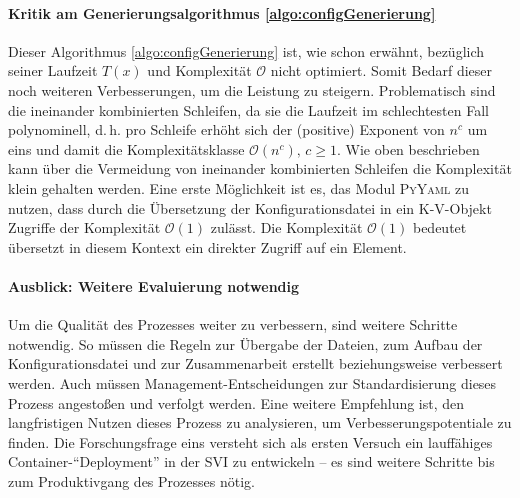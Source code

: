 \paragraph{Kritik am Generierungsalgorithmus \ref{algo:configGenerierung}} Dieser Algorithmus \vref{algo:configGenerierung} ist, wie schon erwähnt, bezüglich seiner Laufzeit $T(x)$ und Komplexität $\mathcal{O}$ nicht optimiert. Somit Bedarf dieser noch weiteren Verbesserungen, um die Leistung zu steigern. Problematisch sind die ineinander kombinierten Schleifen, da sie die Laufzeit im schlechtesten Fall polynominell, d.\,h. pro Schleife erhöht sich der (positive) Exponent von $n^{c}$  um eins und damit die Komplexitätsklasse $\mathcal{O}(n^{c}),\,c \ge 1$. Wie oben beschrieben kann über die Vermeidung von ineinander kombinierten Schleifen die Komplexität klein gehalten werden. Eine erste Möglichkeit ist es, das Modul \textsc{PyYaml} zu nutzen, dass durch die Übersetzung der Konfigurationsdatei in ein \ac{K-V}-Objekt Zugriffe der Komplexität $\mathcal{O}(1)$ zulässt. Die Komplexität $\mathcal{O}(1)$ bedeutet übersetzt in diesem Kontext ein direkter Zugriff auf ein Element.

\paragraph{Ausblick: Weitere Evaluierung notwendig} Um die Qualität des Prozesses weiter zu verbessern, sind weitere Schritte notwendig. So müssen die Regeln zur Übergabe der Dateien, zum Aufbau der Konfigurationsdatei und zur Zusammenarbeit erstellt beziehungsweise verbessert werden. Auch müssen Management-Entscheidungen zur Standardisierung dieses Prozess angestoßen und verfolgt werden. Eine weitere Empfehlung ist, den langfristigen Nutzen dieses Prozess zu analysieren, um Verbesserungspotentiale zu finden. Die Forschungsfrage eins versteht sich als ersten Versuch ein lauffähiges Container-\enquote{Deployment} in der \ac{SVI} zu entwickeln -- es sind weitere Schritte bis zum Produktivgang des Prozesses nötig.